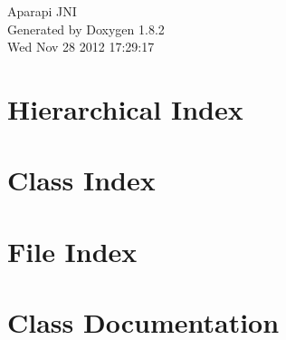 \documentclass{book}
\begin{document}
\hypersetup{pageanchor=false,citecolor=blue}
\begin{titlepage}
\vspace*{7cm}
\begin{center}
{\Large Aparapi J\-N\-I }\\
\vspace*{1cm}
{\large Generated by Doxygen 1.8.2}\\
\vspace*{0.5cm}
{\small Wed Nov 28 2012 17:29:17}\\
\end{center}
\end{titlepage}
\clearemptydoublepage
{}
\tableofcontents
\clearemptydoublepage
{}
\hypersetup{pageanchor=true,citecolor=blue}
\chapter{Hierarchical Index}

\chapter{Class Index}

\chapter{File Index}

\chapter{Class Documentation}


















\end{document}

